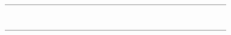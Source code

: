\begin{table}
\begin{tabular}{p{4.5cm}*{26}{D}}
\anonstrut\textcolor{codelabel}{} & \X &  & \X & \X & \X & \X &  &  &  &  & \X & \X &  &  & \X &  & \X &  &  & \X &  &  &  &  &  &  \\
\anonstrut\textcolor{codelabel}{} & \X &  &  & \X &  &  &  &  &  & \X &  & \X &  &  &  &  & \X &  &  &  &  &  &  &  &  &  \\
\anonstrut\textcolor{codelabel}{} & \X &  &  &  & \X & \X &  &  &  & \X &  & \X & \X & \X & \X & \X & \X & \X &  &  &  &  &  &  & \X &  \\
\anonstrut\textcolor{codelabel}{} & \X &  &  & \X &  &  &  & \X & \X & \X &  &  & \X &  &  &  &  & \X &  &  &  &  &  &  &  &  \\
\citet{wesselkaemperOptimizationProcessingCosts2025} & \X &  & \X & \X & \X &  & \X &  & \X & \X &  & \X & \X &  &  &  &  & \X &  & \X & \X & \X &  &  & \X &  \\
\anonstrut\textcolor{codelabel}{} &  & \X & \X &  & \X &  & \X & \X & \X & \X &  & \X &  &  &  &  &  & \X &  & \X & \X & \X &  &  & \X &  \\
\anonstrut\textcolor{codelabel}{} & \X &  & \X & \X & \X & \X &  & \X &  & \X &  & \X &  &  &  &  & \X &  &  &  &  &  &  &  & \X &  \\
\anonstrut\textcolor{codelabel}{} & \X &  & \X & \X & \X & \X & \X & \X &  &  & \X & &  &  &  &  &  & \X &  &  &  &  &  &  & \X &  \\
\bottomrule
\end{tabular}
\end{table}
 \tagmcend
 

